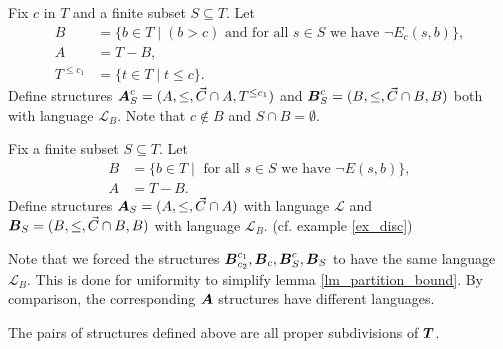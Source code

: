 \documentclass{amsart}
\DeclareMathOperator{\TT}{\boldface T}
\DeclareMathOperator{\AT}{\boldface A}
\DeclareMathOperator{\BT}{\boldface B}
\renewcommand{\LL}{\mathcal L}
\begin{document}
\begin{Definition}
  Fix $c$ in $T$ and  a finite subset $S \subseteq T$. Let
  \begin{align*}
    B &= \{b \in T \mid (b > c) \text{ and for all $s \in S$ we have } \neg E_c(s, b)\}, \\
    A &= T - B, \\
    T^{\leq c_1} &= \{t \in T \mid t \leq c\}.
  \end{align*}
  Define structures $\AT^{c}_{S} = (A, \leq, \vec C\cap A, T^{\leq c_1})$ and $\BT^{c}_{S} = (B, \leq, \vec C\cap B, B)$ both with language $\LL_B$.
  Note that $c \notin B$ and $S \cap B = \emptyset$.
\end{Definition}

\begin{Definition}
  Fix  a finite subset $S \subseteq T$. Let
  \begin{align*}
    B &= \{b \in T \mid \text{ for all $s \in S$ we have } \neg E(s, b)\}, \\
    A &= T - B.
  \end{align*}
  Define structures $\AT_{S} = (A, \leq, \vec C \cap A)$ with language $\LL$ and $\BT_{S} = (B, \leq, \vec C\cap B, B)$ with language $\LL_B$.
  (cf. example \ref{ex_disc})
\end{Definition}

Note that we forced the structures $\BT^{c_1}_{c_2}, \BT_c, \BT^{c}_{S}, \BT_{S}$ to have the same language $\LL_B$.
This is done for uniformity to simplify lemma \ref{lm_partition_bound}.
By comparison, the corresponding $\AT$ structures have different languages.

\begin{Lemma} \label{subdivide}
  The pairs of structures defined above are all proper subdivisions of $\TT$.
\end{Lemma}
\end{document}
